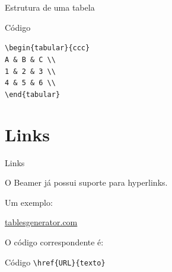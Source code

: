 \documentclass{beamer}
\begin{document}

\begin{frame}{Estrutura de uma tabela}

    \begin{block}{Código}

        \texttt{\textbackslash begin\{tabular\}\{ccc\}}\\[0.2cm]

        \hspace{0.5cm}
        \texttt{A \& B \& C \textbackslash\textbackslash}\\

        \hspace{0.5cm}
        \texttt{1 \& 2 \& 3 \textbackslash\textbackslash}\\

        \hspace{0.5cm}
        \texttt{4 \& 5 \& 6 \textbackslash\textbackslash}\\[0.2cm]

        \texttt{\textbackslash end\{tabular\}}

    \end{block}

\end{frame}

\section{Links}

\begin{frame}{Links}

    O Beamer já possui suporte para hyperlinks.

    \vspace{0.5cm}

    Um exemplo:

    \vspace{0.3cm}

    \begin{center}
        \href{https://www.tablesgenerator.com}{tablesgenerator.com}
    \end{center}

    \vspace{0.5cm}

    O código correspondente é:

    \begin{block}{Código}
        \texttt{\textbackslash href\{URL\}\{texto\}}
    \end{block}

\end{frame}
\end{document}
